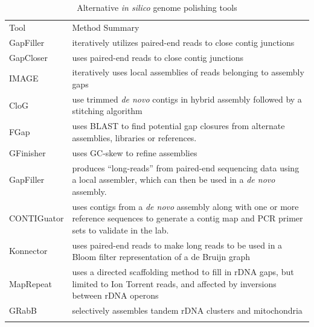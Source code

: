 \documentclass[10pt]{article}
\makeatletter
\newcommand{\ra}[1]{\renewcommand{\arraystretch}{#1}}
\newcommand{\cmidrules}[1]{%
  \noalign{%
    \global\MD@cmidrules={}%
    \toks@={\cmidrule(l{.3\tabcolsep}r{.3\tabcolsep})}%
    \count@=\z@
    \loop\ifnum\count@<#1\relax
      \advance\count@\@ne
      \edef\MD@temp{\the\toks@{\the\count@-\the\count@}}%
      \global\MD@cmidrules\expandafter{\the\expandafter\MD@cmidrules\MD@temp}%
    \repeat
  }%
  \the\MD@cmidrules
}
\makeatother
\begin{document}
\begin{linenumbers}
\begin{table}[!h]
\centering
\ra{1.3}
\caption{Alternative \textit{\textit{in silico}} genome polishing tools}
\label{table:tools}
\begin{tabular}{p{2.6cm}p{11cm}}
  \toprule
  Tool &  Method Summary \\
  \cmidrules{2}
  GapFiller\cite{Boetzer2012} & iteratively utilizes paired-end reads to close contig junctions \\
    \arrayrulecolor{lgray}\hline
  GapCloser\cite{Luo2012} & uses paired-end reads to close contig junctions \\
  \hline
  IMAGE \cite{Tsai2010} & iteratively uses local assemblies of reads belonging to  assembly gaps \\
  \hline
  CloG \cite{Yang2011} & use trimmed \textit{de novo} contigs in hybrid assembly followed by a stitching algorithm \\
  \hline
  FGap \cite{Piro2014,Guizelini2016} & uses BLAST to find potential gap closures from alternate assemblies, libraries or references. \\
  \hline
  GFinisher \cite{Guizelini2016} & uses GC-skew to refine assemblies \\
  \hline
  GapFiller \cite{Nadalin2012} &  produces ``long-reads'' from paired-end sequencing data using a local assembler, which can then be used in a \textit{de novo} assembly. \\
  \hline
  CONTIGuator\cite{Galardini2011} & uses contigs from a \textit{de novo} assembly along with one or more reference sequences to generate a contig map and PCR primer sets to validate in the lab. \\
  \hline
  Konnector\cite{Vandervalk2015} & uses paired-end reads to make long reads to be used in a Bloom filter representation of a de Bruijn graph \\
  \hline
  MapRepeat\cite{Mariano2015} & uses a directed scaffolding method to fill in rDNA gaps, but limited to Ion Torrent reads, and affected by inversions between rDNA operons \cite{Mariano2016} \\
  \hline
  GRabB\cite{Brankovics2016} & selectively assembles tandem rDNA clusters and mitochondria\\
    \arrayrulecolor{black}
  \bottomrule
\end{tabular}

\end{table}
\end{linenumbers}
\end{document}
